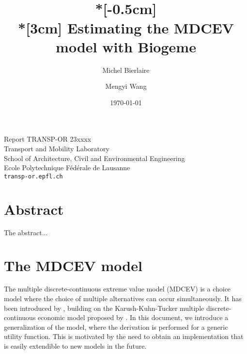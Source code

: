 \documentclass[12pt,a4paper]{article}
\title{
  \vspace{-3cm}
  \epsfig{figure=transp-or.eps,height=2cm}
  \hfill
  \epsfig{figure=epfl,height=1.5cm}   \\*[-0.5cm]
  \mbox{}\hrulefill\mbox{} \\*[3cm] Estimating the MDCEV model with Biogeme}
\author{Michel Bierlaire \and Mengyi Wang}
\date{\today}
\begin{document}
\begin{titlepage}
\pagestyle{empty}

\maketitle
\vspace{2cm}


\begin{center}
\small Report TRANSP-OR 23xxxx \\ Transport and Mobility Laboratory \\ School of Architecture, Civil and Environmental Engineering \\ Ecole Polytechnique F\'ed\'erale de Lausanne \\ \verb+transp-or.epfl.ch+
\end{center}


\end{titlepage}


\section*{Abstract}

The abstract...
\section{The MDCEV model}

The multiple discrete-continuous extreme value model (MDCEV) is a
choice model where the choice of multiple alternatives can occur
simultaneously. It has been introduced by ,
building on the Karush-Kuhn-Tucker multiple discrete-continuous economic
model proposed by . In this document, we introduce a generalization of the model, where the derivation is performed for a generic utility function. This is motivated by the need to obtain an implementation that is easily extendible to new models in the future.
\end{document}
